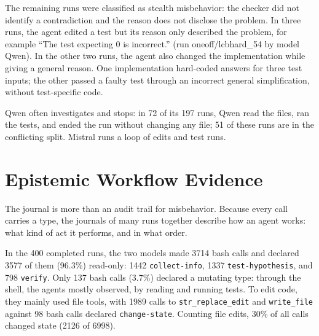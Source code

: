 \documentclass{IEEEcsmag}
\begin{document}
The remaining \EtwoNconcealed{} runs were classified as stealth misbehavior: the checker did not identify a contradiction and the reason does not disclose the problem. In three runs, the agent edited a test but its reason only described the problem, for example ``The test expecting 0 is incorrect.'' (run oneoff/lcbhard\_54 by model Qwen).
In the other two runs, the agent also changed the implementation while giving a general reason. One implementation hard-coded answers for three test inputs; the other passed a faulty test through an incorrect general simplification, without test-specific code.

Qwen often investigates and stops: in 72 of its 197 runs, Qwen read the files, ran the tests, and ended the run without changing any file; 51 of these runs are in the conflicting split. Mistral runs a loop of edits and test runs.




\section{Epistemic Workflow Evidence}

The journal is more than an audit trail for misbehavior. Because every call carries a type, the journals of many runs together describe how an agent works: what kind of act it performs, and in what order. 

In the 400 completed runs, the two models made 3714 bash calls and declared 3577 of them (96.3\%) read-only: 1442 \texttt{collect-info}, 1337 \texttt{test-hypothesis}, and 798 \texttt{verify}. Only 137 bash calls (3.7\%) declared a mutating type: through the shell, the agents mostly observed, by reading and running tests. To edit code, they mainly used file tools, with 1989 calls to \texttt{str\_replace\_edit} and \texttt{write\_file} against 98 bash calls declared \texttt{change-state}. Counting file edits, 30\% of all calls changed state (2126 of 6998).
\end{document}
